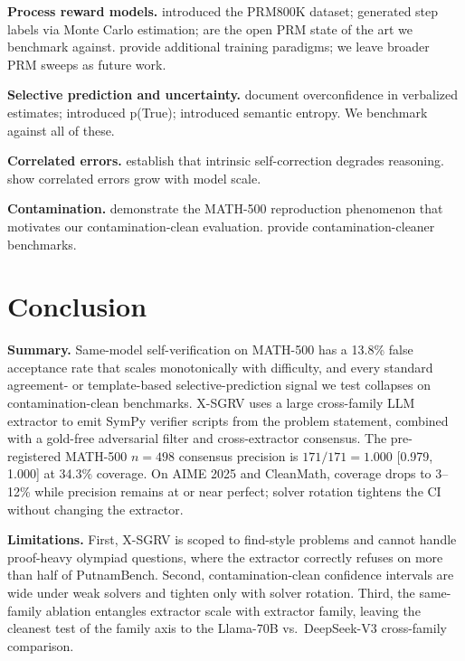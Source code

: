 \documentclass{article}
\begin{document}
\textbf{Process reward models.} \citet{lightman2024prm} introduced the PRM800K dataset; \citet{mathshepherd2024} generated step labels via Monte Carlo estimation; \citet{qwenprm2025, skyworkprm2024} are the open PRM state of the art we benchmark against. \citet{rstarmath2025, prime2025, acemath2024} provide additional training paradigms; we leave broader PRM sweeps as future work.

\textbf{Selective prediction and uncertainty.} \citet{xiong2024llmuncertainty} document overconfidence in verbalized estimates; \citet{kadavath2022} introduced p(True); \citet{kuhn2023semantic, farquhar2024nature} introduced semantic entropy. We benchmark against all of these.

\textbf{Correlated errors.} \citet{huang2024selfcorrect, tyen2024llm, stechly2024selfverify} establish that intrinsic self-correction degrades reasoning. \citet{kim2025correlated} show correlated errors grow with model scale.

\textbf{Contamination.} \citet{wu2025contam} demonstrate the MATH-500 reproduction phenomenon that motivates our contamination-clean evaluation. \citet{olympiadbench2024, omnimath2024, matharena2025, mathperturb2025} provide contamination-cleaner benchmarks.

\section{Conclusion}

\textbf{Summary.} Same-model self-verification on MATH-500 has a 13.8\% false acceptance rate that scales monotonically with difficulty, and every standard agreement- or template-based selective-prediction signal we test collapses on contamination-clean benchmarks. X-SGRV uses a large cross-family LLM extractor to emit SymPy verifier scripts from the problem statement, combined with a gold-free adversarial filter and cross-extractor consensus. The pre-registered MATH-500 $n{=}498$ consensus precision is $171/171 = 1.000$ [0.979, 1.000] at 34.3\% coverage. On AIME 2025 and CleanMath, coverage drops to 3--12\% while precision remains at or near perfect; solver rotation tightens the CI without changing the extractor.

\textbf{Limitations.} First, X-SGRV is scoped to find-style problems and cannot handle proof-heavy olympiad questions, where the extractor correctly refuses on more than half of PutnamBench. Second, contamination-clean confidence intervals are wide under weak solvers and tighten only with solver rotation. Third, the same-family ablation entangles extractor scale with extractor family, leaving the cleanest test of the family axis to the Llama-70B vs.\ DeepSeek-V3 cross-family comparison.
\end{document}
